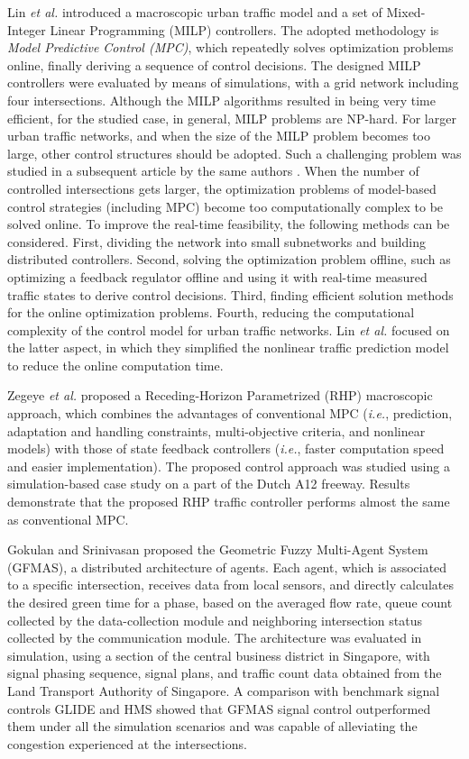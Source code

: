 \documentclass[10pt,onecolumn]{article}
\begin{document}
Lin \textit{et al.} \cite{Lin2011b} introduced a macroscopic urban traffic model and a set of Mixed-Integer Linear Programming (MILP) controllers. The adopted methodology is \textit{Model Predictive Control (MPC)}, which repeatedly solves optimization problems online, finally deriving a sequence of control decisions. 
The designed MILP controllers were evaluated by means of simulations, with a grid network including four intersections. Although the MILP algorithms resulted in being very time efficient, for the studied case, in general, MILP problems are NP-hard. 
For larger urban traffic networks, and when the size of the MILP problem becomes too large, other control structures should be adopted. 
Such a challenging problem was studied in a subsequent article by the same authors \cite{Lin2012}. When the number of controlled intersections gets larger, the optimization problems of model-based control strategies (including MPC) become too computationally complex to be solved online. To improve the real-time feasibility, the following methods can be considered. First, dividing the network into small subnetworks and building distributed controllers. Second, solving the optimization problem offline, such as optimizing a feedback regulator offline and using it with real-time measured traffic states to derive control decisions. Third, finding efficient solution methods for the online optimization problems. Fourth, reducing the computational complexity of the control model for urban traffic networks. Lin \textit{et al.} focused on the latter aspect, in which they simplified the nonlinear traffic prediction model to reduce the online computation time. 

Zegeye \textit{et al.} \cite{Zegeye2012} proposed a Receding-Horizon Parametrized (RHP) macroscopic approach, which combines the advantages of conventional MPC (\textit{i.e.}, prediction, adaptation and handling constraints, multi-objective criteria, and nonlinear models) with those of state feedback controllers (\textit{i.e.}, faster computation speed and easier implementation). 
The proposed control approach was studied using a simulation-based case study on a part of the Dutch A12 freeway.
Results demonstrate that the proposed RHP traffic controller performs almost the same as conventional MPC.

 
Gokulan and Srinivasan \cite{Gokulan2010} proposed the Geometric Fuzzy Multi-Agent System (GFMAS), a distributed architecture of agents.
Each agent, which is associated to a specific intersection, receives data from local sensors, and directly calculates the desired green time for a phase, based on the averaged flow rate, queue count collected by the data-collection module and neighboring intersection status collected by the communication module. 
The architecture was evaluated in simulation, using a section of the central business district in Singapore, with signal phasing sequence, signal plans, and traffic count data obtained from the Land Transport Authority of Singapore. A comparison with benchmark signal controls GLIDE and HMS showed that GFMAS signal control outperformed them under all the simulation scenarios and was capable of alleviating the congestion experienced at the intersections.
\end{document}

